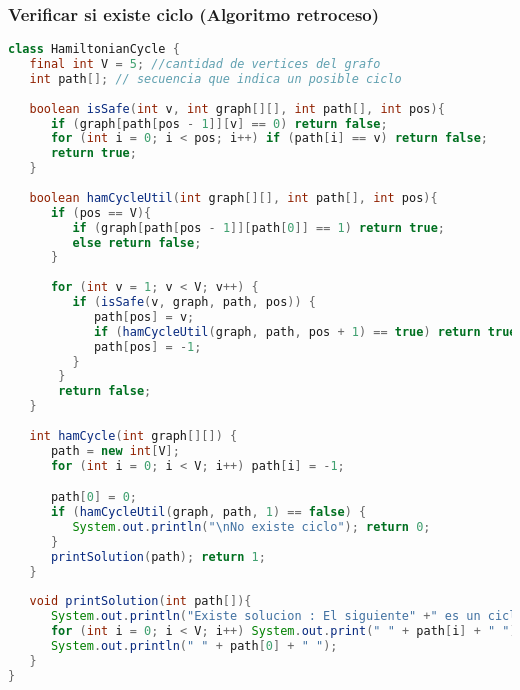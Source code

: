 \subsubsection{Verificar si existe ciclo (Algoritmo retroceso)}
\begin{lstlisting}[language=Java]
class HamiltonianCycle {
   final int V = 5; //cantidad de vertices del grafo
   int path[]; // secuencia que indica un posible ciclo
	
   boolean isSafe(int v, int graph[][], int path[], int pos){
      if (graph[path[pos - 1]][v] == 0) return false;
      for (int i = 0; i < pos; i++) if (path[i] == v) return false;
      return true;
   }
   
   boolean hamCycleUtil(int graph[][], int path[], int pos){
      if (pos == V){
         if (graph[path[pos - 1]][path[0]] == 1) return true;
         else return false;
      }
		
      for (int v = 1; v < V; v++) {
         if (isSafe(v, graph, path, pos)) {
            path[pos] = v;
            if (hamCycleUtil(graph, path, pos + 1) == true) return true;
            path[pos] = -1;
         }
       }
       return false;
   }
	
   int hamCycle(int graph[][]) {
      path = new int[V];
      for (int i = 0; i < V; i++) path[i] = -1;

      path[0] = 0;
      if (hamCycleUtil(graph, path, 1) == false) {
         System.out.println("\nNo existe ciclo"); return 0;
      }
      printSolution(path); return 1;
   }
	
   void printSolution(int path[]){
      System.out.println("Existe solucion : El siguiente" +" es un ciclo de Hamilton");
      for (int i = 0; i < V; i++) System.out.print(" " + path[i] + " ");
      System.out.println(" " + path[0] + " ");
   }
}
\end{lstlisting}

